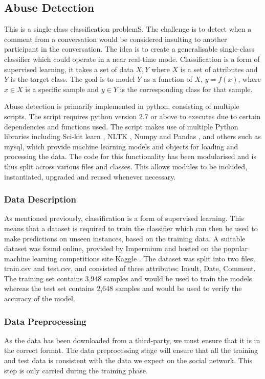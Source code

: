 \subsection{Abuse Detection}
This is a single-class classification problemS. The challenge is to detect when a comment from a conversation would be considered insulting to another participant in the conversation. The idea is to create a generalisable single-class classifier which could operate in a near real-time mode. Classification is a form of supervised learning, it takes a set of data ${X, Y}$ where $X$ is a set of attributes and $Y$ is the target class. The goal is to model $Y$ as a function of $X$, $y = f(x)$, where $x \in X$ is a specific sample and $y \in Y$ is the corresponding class for that sample.

Abuse detection is primarily implemented in python, consisting of multiple scripts. The script requires python version 2.7 or above to executes due to certain dependencies and functions used. The script makes use of multiple Python libraries including Sci-kit learn \cite{scikit:home}, NLTK \cite{nltk}, Numpy \cite{Numpy} and Pandas \cite{Pandas}, and others such as mysql, which provide machine learning models and objects for loading and processing the data. The code for this functionality has been modularised and is thus split across various files and classes. This allows modules to be included, instantiated, upgraded and reused whenever necessary.

\subsubsection{Data Description}
As mentioned previously, classification is a form of supervised learning. This means that a dataset is required to train the classifier which can then be used to make predictions on unseen instances, based on the training data. A suitable dataset was found online, provided by Impermium and hosted on the popular machine learning competitions site Kaggle \cite{Kaggle:Dataset}. The dataset was split into two files, train.csv and test.csv, and consisted of three attributes: Insult, Date, Comment. The training set contains 3,948 samples and would be used to train the models whereas the test set contains 2,648 samples and would be used to verify the accuracy of the model.


\subsubsection{Data Preprocessing}
As the data has been downloaded from a third-party, we must ensure that it is in the correct format. The data preprocessing stage will ensure that all the training and test data is consistent with the data we expect on the social network. This step is only carried during the training phase.

